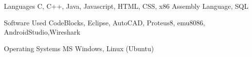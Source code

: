 

\begin{cvskills}

  \cvskill
    {Languages} %
    {C, C++, Java, Javascript, HTML, CSS, x86 Assembly Language, SQL } %

  \cvskill
    {Software Used} %
    {CodeBlocks, Eclipse, AutoCAD, Proteus8, emu8086, AndroidStudio,Wireshark} %

  \cvskill
    {Operating Systems} %
    {MS Windows, Linux (Ubuntu)} %

\end{cvskills}
